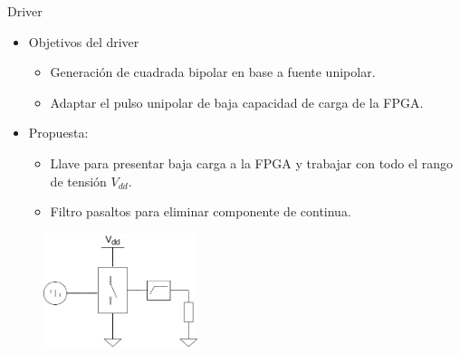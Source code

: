 \documentclass{beamer}
\begin{document}
\begin{frame}{Driver}

    \begin{itemize}
        \item Objetivos del driver
            \begin{itemize}
                \item Generación de cuadrada bipolar en base a fuente unipolar.
                \item Adaptar el pulso unipolar de baja capacidad de carga de la FPGA.
            \end{itemize}
        \item Propuesta:
            \begin{itemize}
                \item Llave para presentar baja carga a la FPGA y trabajar con
                    todo el rango de tensión $V_{dd}$.
                \item Filtro pasaltos para eliminar componente de continua.
            \end{itemize}
    \end{itemize}

    \begin{figure}[t]
        \centering
        \includegraphics[width=0.4\textwidth]{images/driver.drawio.png}
        \label{fig:driver_block_diagram}
    \end{figure}

\end{frame}
\end{document}
